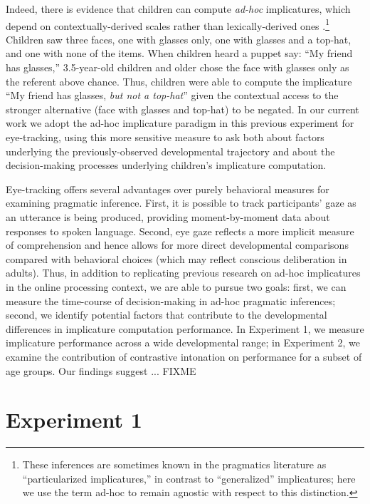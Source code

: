 \documentclass[10pt,letterpaper]{article}
\begin{document}
Indeed, there is evidence that children can compute \emph{ad-hoc} implicatures, which depend on contextually-derived scales rather than lexically-derived ones \cite{stillerLLD}.\footnote{These inferences are sometimes known in the pragmatics literature as ``particularized implicatures,'' in contrast to ``generalized'' implicatures; here we use the term ad-hoc to remain agnostic with respect to this distinction.} Children saw three faces, one with glasses only, one with glasses and a top-hat, and one with none of the items. When children heard a puppet say: ``My friend has glasses,'' 3.5-year-old children and older chose the face with glasses only as the referent above chance. Thus, children were able to compute the implicature ``My friend has glasses, \emph{but not a top-hat}'' given the contextual access to the stronger alternative (face with glasses and top-hat) to be negated. In our current work we adopt the ad-hoc implicature paradigm in this previous experiment for eye-tracking, using this more sensitive measure to ask both about factors underlying the previously-observed developmental trajectory and about the decision-making processes underlying children's implicature computation.

Eye-tracking offers several advantages over purely behavioral measures for examining pragmatic inference. First, it is possible to track participants' gaze as an utterance is being produced, providing moment-by-moment data about responses to spoken language. Second, eye gaze reflects a more implicit measure of comprehension and hence allows for more direct developmental comparisons compared with behavioral choices (which may reflect conscious deliberation in adults). Thus, in addition to replicating previous research on ad-hoc implicatures in the online processing context, we are able to pursue two goals: first, we can measure the time-course of decision-making in ad-hoc pragmatic inferences; second, we identify potential factors that contribute to the developmental differences in implicature computation performance. In Experiment 1, we measure implicature performance across a wide developmental range; in Experiment 2, we examine the contribution of contrastive intonation on performance for a subset of age groups. Our findings suggest ... FIXME %

\section{Experiment 1}
\end{document}
